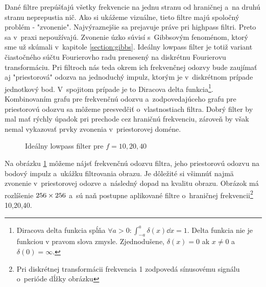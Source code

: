 Dané filtre prepúšťajú všetky frekvencie na jednu stranu od hraničnej
a~na druhú stranu neprepustia nič. Ako si ukážeme vizuálne, tieto
filtre majú spoločný problém - "zvonenie". Najvýraznejšie sa prejavuje
práve pri highpass filtri. Preto sa v~praxi nepoužívajú.
Zvonenie úzko súvisí s~Gibbsovým fenoménom, ktorý sme už skúmali
v~kapitole \ref{section:gibbs}. Ideálny lowpass filter je totiž variant čiastočného súčtu
Fourierovho radu prenesený na diskrétnu Fourierovu transformáciu. Pri filtroch
nás teda okrem ich frekvenčnej odozvy bude zaujímať aj "priestorová"
odozva na jednoduchý impulz, ktorým je v~diskrétnom prípade jednotkový
bod. V~spojitom prípade je to Diracova delta funkcia\footnote{
Diracova delta funkcia spĺňa $\forall a>0: \int_{-a}^a \delta(x) \dd x
= 1$. Delta funkcia nie je funkciou v pravom slova zmysle.
Zjednodušene, $\delta(x)=0$ ak $x\not=0$ a $\delta(0)=\infty$.
}. Kombinovaním grafu pre
frekvenčnú odozvu a~zodpovedajúceho grafu pre priestorovú odozvu
sa môžeme presvedčiť o~vlastnostiach filtra. Dobrý filter by
mal mať rýchly úpadok pri prechode cez hraničnú frekvenciu,
zároveň by však nemal vykazovať prvky zvonenia v~priestorovej doméne.

\begin{figure}[htp]
    \def\path{obrazky/informatika/digitalne_filtre}
    \centering
    \caption{Ideálny lowpass filter pre $f=10,20,40$}
    \label{fig:ideal_lowpass_filter}
\end{figure}

Na obrázku \ref{fig:ideal_lowpass_filter} môžeme nájsť
frekvenčnú odozvu filtra, jeho priestorovú odozvu na bodový impulz 
a~ukážku filtrovania obrazu. Je dôležité si všimnúť najmä zvonenie 
v~priestorovej odozve a~následný dopad na kvalitu obrazu. Obrázok má
rozlíšenie $256\times256$ a~sú naň postupne aplikované filtre o~hraničnej
frekvencii\footnote{Pri diskrétnej transformácii
frekvencia 1 zodpovedá sínusovému signálu o~perióde dĺžky obrázku}
10,20,40.

